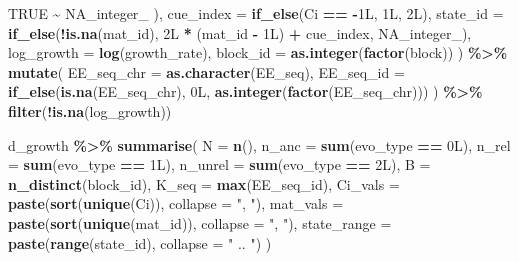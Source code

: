 \documentclass[
]{article}
\newenvironment{Shaded}{\begin{snugshade}}{\end{snugshade}}
\newcommand{\AttributeTok}[1]{\textcolor[rgb]{0.13,0.29,0.53}{#1}}
\newcommand{\ConstantTok}[1]{\textcolor[rgb]{0.56,0.35,0.01}{#1}}
\newcommand{\DataTypeTok}[1]{\textcolor[rgb]{0.13,0.29,0.53}{#1}}
\newcommand{\DecValTok}[1]{\textcolor[rgb]{0.00,0.00,0.81}{#1}}
\newcommand{\FunctionTok}[1]{\textcolor[rgb]{0.13,0.29,0.53}{\textbf{#1}}}
\newcommand{\NormalTok}[1]{#1}
\newcommand{\SpecialCharTok}[1]{\textcolor[rgb]{0.81,0.36,0.00}{\textbf{#1}}}
\newcommand{\StringTok}[1]{\textcolor[rgb]{0.31,0.60,0.02}{#1}}
\begin{document}
\begin{Shaded}
\begin{Highlighting}[]
      \ConstantTok{TRUE} \SpecialCharTok{\textasciitilde{}} \ConstantTok{NA\_integer\_}
\NormalTok{    ),}
    \AttributeTok{cue\_index =} \FunctionTok{if\_else}\NormalTok{(Ci }\SpecialCharTok{==} \SpecialCharTok{{-}}\DecValTok{1}\DataTypeTok{L}\NormalTok{, }\DecValTok{1}\DataTypeTok{L}\NormalTok{, }\DecValTok{2}\DataTypeTok{L}\NormalTok{),}
    \AttributeTok{state\_id =} \FunctionTok{if\_else}\NormalTok{(}\SpecialCharTok{!}\FunctionTok{is.na}\NormalTok{(mat\_id), }\DecValTok{2}\DataTypeTok{L} \SpecialCharTok{*}\NormalTok{ (mat\_id }\SpecialCharTok{{-}} \DecValTok{1}\DataTypeTok{L}\NormalTok{) }\SpecialCharTok{+}\NormalTok{ cue\_index, }\ConstantTok{NA\_integer\_}\NormalTok{),}
    \AttributeTok{log\_growth =} \FunctionTok{log}\NormalTok{(growth\_rate),}
    \AttributeTok{block\_id =} \FunctionTok{as.integer}\NormalTok{(}\FunctionTok{factor}\NormalTok{(block))}
\NormalTok{  ) }\SpecialCharTok{\%\textgreater{}\%}
  \FunctionTok{mutate}\NormalTok{(}
    \AttributeTok{EE\_seq\_chr =} \FunctionTok{as.character}\NormalTok{(EE\_seq),}
    \AttributeTok{EE\_seq\_id =} \FunctionTok{if\_else}\NormalTok{(}\FunctionTok{is.na}\NormalTok{(EE\_seq\_chr), }\DecValTok{0}\DataTypeTok{L}\NormalTok{, }\FunctionTok{as.integer}\NormalTok{(}\FunctionTok{factor}\NormalTok{(EE\_seq\_chr)))}
\NormalTok{  ) }\SpecialCharTok{\%\textgreater{}\%}
  \FunctionTok{filter}\NormalTok{(}\SpecialCharTok{!}\FunctionTok{is.na}\NormalTok{(log\_growth))}

\NormalTok{d\_growth }\SpecialCharTok{\%\textgreater{}\%}
  \FunctionTok{summarise}\NormalTok{(}
    \AttributeTok{N =} \FunctionTok{n}\NormalTok{(),}
    \AttributeTok{n\_anc =} \FunctionTok{sum}\NormalTok{(evo\_type }\SpecialCharTok{==} \DecValTok{0}\DataTypeTok{L}\NormalTok{),}
    \AttributeTok{n\_rel =} \FunctionTok{sum}\NormalTok{(evo\_type }\SpecialCharTok{==} \DecValTok{1}\DataTypeTok{L}\NormalTok{),}
    \AttributeTok{n\_unrel =} \FunctionTok{sum}\NormalTok{(evo\_type }\SpecialCharTok{==} \DecValTok{2}\DataTypeTok{L}\NormalTok{),}
    \AttributeTok{B =} \FunctionTok{n\_distinct}\NormalTok{(block\_id),}
    \AttributeTok{K\_seq =} \FunctionTok{max}\NormalTok{(EE\_seq\_id),}
    \AttributeTok{Ci\_vals =} \FunctionTok{paste}\NormalTok{(}\FunctionTok{sort}\NormalTok{(}\FunctionTok{unique}\NormalTok{(Ci)), }\AttributeTok{collapse =} \StringTok{", "}\NormalTok{),}
    \AttributeTok{mat\_vals =} \FunctionTok{paste}\NormalTok{(}\FunctionTok{sort}\NormalTok{(}\FunctionTok{unique}\NormalTok{(mat\_id)), }\AttributeTok{collapse =} \StringTok{", "}\NormalTok{),}
    \AttributeTok{state\_range =} \FunctionTok{paste}\NormalTok{(}\FunctionTok{range}\NormalTok{(state\_id), }\AttributeTok{collapse =} \StringTok{" .. "}\NormalTok{)}
\NormalTok{  )}
\end{Highlighting}
\end{Shaded}
\end{document}
